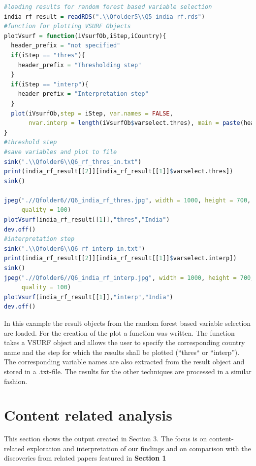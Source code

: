 \documentclass[12pt,a4paper,english]{article}
\begin{document}
\begin{lstlisting}[language= R, captionpos=b,caption=\href{https://github.com/jaidikam/sps_ws1718/tree/master/Qfolder6}{SPL\_Q6\_result\_exploration}]
#loading results for random forest based variable selection 
india_rf_result = readRDS(".\\Qfolder5\\Q5_india_rf.rds")
#function for plotting VSURF Objects
plotVsurf = function(iVsurfOb,iStep,iCountry){
  header_prefix = "not specified"
  if(iStep == "thres"){
    header_prefix = "Thresholding step"
  }
  if(iStep == "interp"){
    header_prefix = "Interpretation step"
  }
  plot(iVsurfOb,step = iStep, var.names = FALSE,
       nvar.interp = length(iVsurfOb$varselect.thres), main = paste(header_prefix,iCountry))
}
#threshold step 
#save variables and plot to file
sink(".\\Qfolder6\\Q6_rf_thres_in.txt")
print(india_rf_result[[2]][india_rf_result[[1]]$varselect.thres])
sink() 

jpeg(".//Qfolder6//Q6_india_rf_thres.jpg", width = 1000, height = 700, units = "px", pointsize = 20,
     quality = 100)
plotVsurf(india_rf_result[[1]],"thres","India")
dev.off()
#interpretation step 
sink(".\\Qfolder6\\Q6_rf_interp_in.txt")
print(india_rf_result[[2]][india_rf_result[[1]]$varselect.interp])
sink()
jpeg(".//Qfolder6//Q6_india_rf_interp.jpg", width = 1000, height = 700, units = "px", pointsize = 20,
     quality = 100)
plotVsurf(india_rf_result[[1]],"interp","India")
dev.off()
\end{lstlisting}

In this example the result objects from the random forest based variable selection are loaded. For the creation of the plot a function was written. The function takes a VSURF object and allows the user to specify the corresponding country name and the step for which the results shall be plotted (“thres“ or “interp”). The corresponding variable names are also extracted from the result object and stored in a .txt-file. The results for the other techniques are processed in a similar fashion.

\section{Content related analysis}

This section shows the output created in Section 3. The focus is on content-related exploration and interpretation of our findings and on comparison with the discoveries from related papers featured in \textbf{Section 1}
\end{document}
